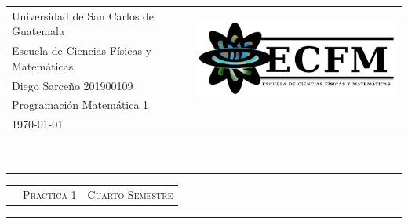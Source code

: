

\begin{tabulary}{20cm}{Lp{0.9cm}p{6.1cm}}
Universidad de San Carlos de Guatemala & & \\            %
Escuela de Ciencias Físicas y Matemáticas & \hfill & \\
Diego Sarceño 201900109 & \hfill & \\
Programación Matemática 1 & \hfill & \\
\today & & \\
\end{tabulary}\\[0.25cm]

{\hrule height 1.5pt} \vspace{0.1cm}
\begin{tabulary}{21cm}{p{7cm}p{7cm}p{7cm}}
    \hfill & \huge{\scshape{Practica 1}} & \footnotesize{\scshape{Cuarto Semestre}}
\end{tabulary}
{\hrule height 1.5pt}
\vspace{0.5cm}
